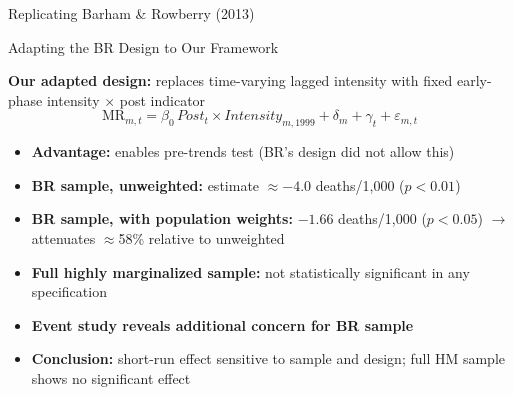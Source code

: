 \documentclass[aspectratio=169,usenames,dvipsnames]{beamer}
\begin{document}
\begin{frame}{Replicating Barham \& Rowberry (2013)}
\vspace{6pt}

\end{frame}


\begin{frame}{Adapting the BR Design to Our Framework}\label{br_adapt}
\small

\textbf{Our adapted design:} replaces time-varying lagged intensity with fixed early-phase intensity $\times$ post indicator
\begin{equation*}
\text{MR}_{m,t} = \beta_0\,\textit{Post}_t \times \textit{Intensity}_{m,1999} + \delta_m + \gamma_t + \varepsilon_{m,t}
\end{equation*}

\vspace{6pt}

\begin{itemize}
  \item[$\circ$] \textbf{Advantage:} enables pre-trends test (BR's design did not allow this)
  \item[$\circ$] \textbf{BR sample, unweighted:} estimate $\approx -4.0$ deaths/1,000 ($p<0.01$)
  \item[$\circ$] \textbf{BR sample, with population weights:} $-1.66$ deaths/1,000 ($p<0.05$) $\to$ attenuates $\approx$58\% relative to unweighted
  \item[$\circ$] \textbf{Full highly marginalized sample:} not statistically significant in any specification
  \vspace{6pt}
  \item[$\circ$] \textbf{Event study reveals additional concern for BR sample}
  \vspace{6pt}
  \item[$\circ$] \textbf{Conclusion:} short-run effect sensitive to sample and design; full HM sample shows no significant effect
\end{itemize}

\end{frame}
\end{document}
